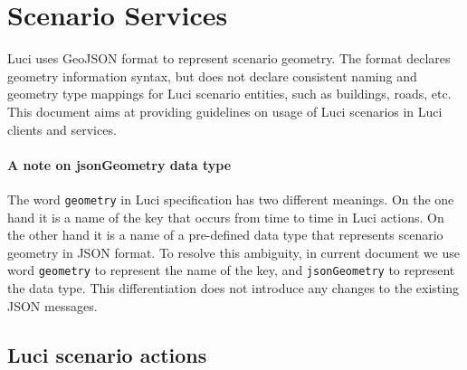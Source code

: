 \section{Scenario Services}
\label{ch:storage}

\ac{Luci} uses GeoJSON format to represent scenario geometry.
The format declares geometry information syntax, but does not declare consistent naming and geometry type mappings for \ac{Luci} scenario entities, such as buildings, roads, etc.
This document aims at providing guidelines on usage of \ac{Luci} scenarios in \ac{Luci} clients and services.

\paragraph{A note on jsonGeometry data type}
The word \texttt{geometry} in \ac{Luci} specification has two different meanings.
On the one hand it is a name of the key that occurs from time to time in \ac{Luci} actions.
On the other hand it is a name of a pre-defined data type that represents scenario geometry in JSON format.
To resolve this ambiguity, in current document we use word \texttt{geometry} to represent the name of the key, and \texttt{\color{blue}jsonGeometry} to represent the data type.
This differentiation does not introduce any changes to the existing JSON messages.

\subsection{\acs{Luci} scenario actions}
\label{sec:services:actions}


